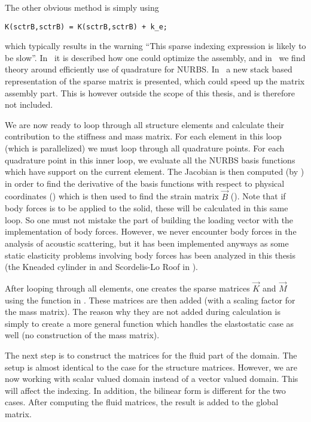 The other obvious method is simply using
\begin{lstlisting}
K(sctrB,sctrB) = K(sctrB,sctrB) + k_e;
\end{lstlisting}
which typically results in the \MATLAB warning ``This sparse indexing expression is likely to be slow''. In~\cite{Karatarakis2013cot} it is described how one could optimize the assembly, and in~\cite{Hughes2010eqf} we find theory around efficiently use of quadrature for NURBS. In~\cite{Jansson2013osm} a new stack based representation of the sparse matrix is presented, which could speed up the matrix assembly part. This is however outside the scope of this thesis, and is therefore not included.

We are now ready to loop through all structure elements and calculate their contribution to the stiffness and mass matrix. For each element in this loop (which is parallelized) we must loop through all quadrature points. For each quadrature point in this inner loop, we evaluate all the NURBS basis functions which have support on the current element. The Jacobian is then computed (by ) in order to find the derivative of the basis functions with respect to physical coordinates () which is then used to find the strain matrix $\vec{B}$ (). Note that if body forces is to be applied to the solid, these will be calculated in this same loop. So one must not mistake the part of building the loading vector with the implementation of body forces. However, we never encounter body forces in the analysis of acoustic scattering, but it has been implemented anyways as some static elasticity problems involving body forces has been analyzed in this thesis (the Kneaded cylinder in  and Scordelis-Lo Roof in ).

After looping through all elements, one creates the sparse matrices $\vec{K}$ and $\vec{M}$ using the  function in \MATLAB. These matrices are then added (with a scaling factor for the mass matrix). The reason why they are not added during calculation is simply to create a more general function which handles the elastostatic case as well (no construction of the mass matrix).

The next step is to construct the matrices for the fluid part of the domain. The setup is almost identical to the case for the structure matrices. However, we are now working with scalar valued domain instead of a vector valued domain. This will affect the indexing. In addition, the bilinear form is different for the two cases. After computing the fluid matrices, the result is added to the global matrix.

